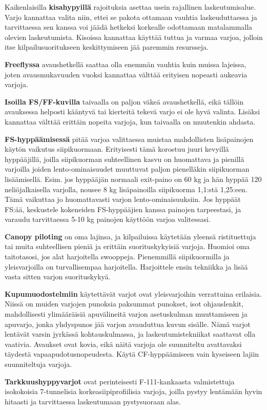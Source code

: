 Kaikenlaisilla \textbf{kisahypyillä} rajoituksia asettaa usein rajallinen laskeutumisalue. Varjo kannattaa valita niin, ettei se pakota ottamaan vauhtia laskeuduttaessa ja tarvittaessa sen kanssa voi jäädä hetkeksi korkealle odottamaan matalammalla olevien laskeutumista. Kisoissa kannattaa käyttää tuttua ja varmaa varjoa, jolloin itse kilpailusuoritukseen keskittymiseen jää paremmin resursseja. 


\textbf{Freeflyssa} avaushetkellä saattaa olla enemmän vauhtia kuin muissa lajeissa, joten avausmukavuuden vuoksi kannattaa välttää erityisen nopeasti aukeavia varjoja. 


\textbf{Isoilla FS/FF-kuvilla} taivaalla on paljon väkeä avaushetkellä, eikä tällöin avauksessa helposti kääntyvä tai kierteitä tekevä varjo ei ole hyvä valinta. Lisäksi kannattaa välttää erittäin nopeita varjoja, kun taivaalla on muutenkin ahdasta. 


\textbf{FS-hyppäämisessä} pitää varjoa valittaessa muistaa mahdollisten lisäpainojen käytön vaikutus siipikuormaan. Erityisesti tämä korostuu juuri kevyillä hyppääjillä, joilla siipikuorman suhteellinen kasvu on huomattava ja pienillä varjoilla joiden lento-ominaisuudet muuttuvat paljon pienelläkin siipikuorman lisäämisellä. Esim. jos hyppääjän normaali exit-paino on 60 kg ja hän hyppää 120 neliöjalkaisella varjolla, nousee 8 kg lisäpainoilla siipikuorma 1,1:stä 1,25:een. Tämä vaikuttaa jo huomattavasti varjon lento-ominaisuuksiin. Jos hyppäät FS:ää, keskustele kokeneiden FS-hyppääjien kanssa painojen tarpeestasi, ja varaudu tarvittaessa 5-10 kg painojen käyttöön varjoa valitessasi.  


\textbf{Canopy piloting} on oma lajinsa, ja kilpailuissa käytetään yleensä ristituettuja tai muita suhteellisen pieniä ja erittäin suorituskykyisiä varjoja. Huomioi oma taitotasosi, jos alat harjoitella swooppeja. Pienemmillä siipikuormilla ja yleisvarjoilla on turvallisempaa harjoitella. Harjoittele ensin tekniikka ja lisää vasta sitten varjon suorituskykyä. 


\textbf{Kupumuodostelmiin} käytettävät varjot ovat yleisvarjoihin verrattuina erilaisia. Niissä on muiden varjojen punoksia paksummat punokset, isot ohjauslenkit, mahdollisesti ylimääräisiä apuvälineitä varjon asetuskulman muuttamiseen ja apuvarjo, jonka yhdyspunos jää varjon avauduttua kuvun sisälle. Nämä varjot lentävät varsin jyrkässä kohtauskulmassa, ja laskeutumistekniikat saattavat olla vaativia. Avaukset ovat kovia, eikä näitä varjoja ole suunniteltu avattavaksi täydestä vapaapudotusnopeudesta. Käytä CF-hyppäämiseen vain kyseiseen lajiin suunniteltuja varjoja. 


\textbf{Tarkkuushyppyvarjot} ovat perinteisesti F-111-kankaasta valmistettuja isokokoisia 7-tunnelisia korkeasiipiprofiilisia varjoja, joilla pystyy lentämään hyvin hitaasti ja tarvittaessa laskeutumaan pystysuoraan alas. 

